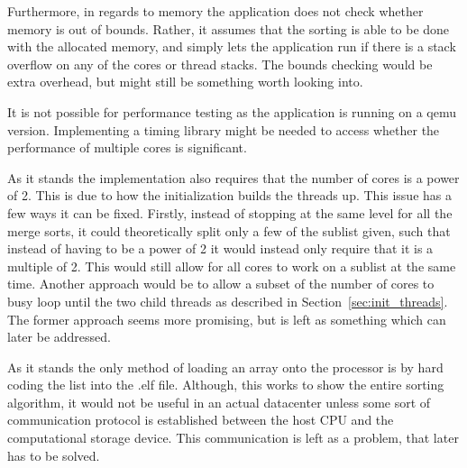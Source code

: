 Furthermore, in regards to memory the application does not check whether memory
is out of bounds. Rather, it assumes that the sorting is able to be done with
the allocated memory, and simply lets the application run if there is a stack
overflow on any of the cores or thread stacks. The bounds checking would be
extra overhead, but might still be something worth looking into.

It is not possible for performance testing as the application is running on a
qemu version. Implementing a timing library might be needed to access whether
the performance of multiple cores is significant.

As it stands the implementation also requires that the number of cores is a
power of 2. This is due to how the initialization builds the threads up. This
issue has a few ways it can be fixed. Firstly, instead of stopping at the same
level for all the merge sorts, it could theoretically split only a few of the
sublist given, such that instead of having to be a power of 2 it would instead
only require that it is a multiple of 2. This would still allow for all cores to
work on a sublist at the same time. Another approach would be to allow a subset
of the number of cores to busy loop until the two child threads as described in
Section~\ref{sec:init_threads}. The former approach seems more promising, but is
left as something which can later be addressed.

As it stands the only method of loading an array onto the processor is by hard
coding the list into the .elf file. Although, this works to show the entire
sorting algorithm, it would not be useful in an actual datacenter unless some
sort of communication protocol is established between the host CPU and the
computational storage device. This communication is left as a problem, that
later has to be solved.




